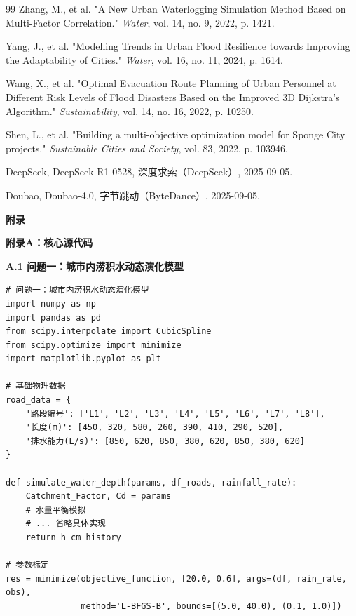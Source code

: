 \documentclass[12pt,a4paper]{article}
\begin{document}
\clearpage

\begin{thebibliography}{99}
     Zhang, M., et al. "A New Urban Waterlogging Simulation Method Based on Multi-Factor Correlation." \textit{Water}, vol. 14, no. 9, 2022, p. 1421.
    
     Yang, J., et al. "Modelling Trends in Urban Flood Resilience towards Improving the Adaptability of Cities." \textit{Water}, vol. 16, no. 11, 2024, p. 1614.
    
     Wang, X., et al. "Optimal Evacuation Route Planning of Urban Personnel at Different Risk Levels of Flood Disasters Based on the Improved 3D Dijkstra's Algorithm." \textit{Sustainability}, vol. 14, no. 16, 2022, p. 10250.
    
     Shen, L., et al. "Building a multi-objective optimization model for Sponge City projects." \textit{Sustainable Cities and Society}, vol. 83, 2022, p. 103946.
    
     DeepSeek, DeepSeek-R1-0528, 深度求索（DeepSeek）, 2025-09-05.
    
     Doubao, Doubao-4.0, 字节跳动（ByteDance）, 2025-09-05.
\end{thebibliography}

\clearpage
\fontsize{14pt}{16pt}\bfseries 附录

\fontsize{12pt}{14pt}\bfseries 附录A：核心源代码

{\fontsize{12pt}{14pt}\bfseries A.1 问题一：城市内涝积水动态演化模型}

{\fontsize{10pt}{12pt}\ttfamily
\begin{verbatim}
# 问题一：城市内涝积水动态演化模型
import numpy as np
import pandas as pd
from scipy.interpolate import CubicSpline
from scipy.optimize import minimize
import matplotlib.pyplot as plt

# 基础物理数据
road_data = {
    '路段编号': ['L1', 'L2', 'L3', 'L4', 'L5', 'L6', 'L7', 'L8'],
    '长度(m)': [450, 320, 580, 260, 390, 410, 290, 520],
    '排水能力(L/s)': [850, 620, 850, 380, 620, 850, 380, 620]
}

def simulate_water_depth(params, df_roads, rainfall_rate):
    Catchment_Factor, Cd = params
    # 水量平衡模拟
    # ... 省略具体实现
    return h_cm_history

# 参数标定
res = minimize(objective_function, [20.0, 0.6], args=(df, rain_rate, obs),
               method='L-BFGS-B', bounds=[(5.0, 40.0), (0.1, 1.0)])
\end{verbatim}
}
\end{document}
